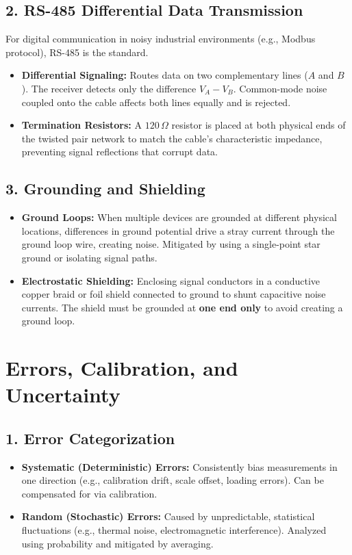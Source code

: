 \documentclass[12pt,a4paper]{article}
\begin{document}
\subsection{2. RS-485 Differential Data Transmission}
For digital communication in noisy industrial environments (e.g., Modbus protocol), RS-485 is the standard.
\begin{itemize}[leftmargin=*, itemsep=2.5pt]
  \item \textbf{Differential Signaling:} Routes data on two complementary lines ($A$ and $B$). The receiver detects only the difference $V_A - V_B$. Common-mode noise coupled onto the cable affects both lines equally and is rejected.
  \item \textbf{Termination Resistors:} A $120\,\Omega$ resistor is placed at both physical ends of the twisted pair network to match the cable's characteristic impedance, preventing signal reflections that corrupt data.
\end{itemize}

\subsection{3. Grounding and Shielding}
\begin{itemize}[leftmargin=*, itemsep=2.5pt]
  \item \textbf{Ground Loops:} When multiple devices are grounded at different physical locations, differences in ground potential drive a stray current through the ground loop wire, creating noise. Mitigated by using a single-point star ground or isolating signal paths.
  \item \textbf{Electrostatic Shielding:} Enclosing signal conductors in a conductive copper braid or foil shield connected to ground to shunt capacitive noise currents. The shield must be grounded at \textbf{one end only} to avoid creating a ground loop.
\end{itemize}

\section{Errors, Calibration, and Uncertainty}

\subsection{1. Error Categorization}
\begin{itemize}[leftmargin=*, itemsep=2.5pt]
  \item \textbf{Systematic (Deterministic) Errors:} Consistently bias measurements in one direction (e.g., calibration drift, scale offset, loading errors). Can be compensated for via calibration.
  \item \textbf{Random (Stochastic) Errors:} Caused by unpredictable, statistical fluctuations (e.g., thermal noise, electromagnetic interference). Analyzed using probability and mitigated by averaging.
\end{itemize}
\end{document}
